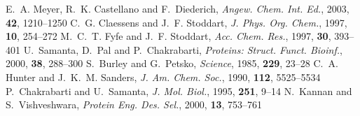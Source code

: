 \documentclass[twoside,twocolumn,9pt]{article}
\begin{document}
\begin{mcitethebibliography}{79}
E.~A. Meyer, R.~K. Castellano and F.~Diederich, \emph{Angew. Chem. Int. Ed.},
  2003, \textbf{42}, 1210--1250\relax
\mciteBstWouldAddEndPuncttrue
\mciteSetBstMidEndSepPunct{\mcitedefaultmidpunct}
{\mcitedefaultendpunct}{\mcitedefaultseppunct}\relax
\EndOfBibitem
{}
C.~G. Claessens and J.~F. Stoddart, \emph{J. Phys. Org. Chem.}, 1997,
  \textbf{10}, 254--272\relax
\mciteBstWouldAddEndPuncttrue
\mciteSetBstMidEndSepPunct{\mcitedefaultmidpunct}
{\mcitedefaultendpunct}{\mcitedefaultseppunct}\relax
\EndOfBibitem
{}
M.~C.~T. Fyfe and J.~F. Stoddart, \emph{Acc. Chem. Res.}, 1997, \textbf{30},
  393--401\relax
\mciteBstWouldAddEndPuncttrue
\mciteSetBstMidEndSepPunct{\mcitedefaultmidpunct}
{\mcitedefaultendpunct}{\mcitedefaultseppunct}\relax
\EndOfBibitem
{}
U.~Samanta, D.~Pal and P.~Chakrabarti, \emph{Proteins: Struct. Funct. Bioinf.},
  2000, \textbf{38}, 288--300\relax
\mciteBstWouldAddEndPuncttrue
\mciteSetBstMidEndSepPunct{\mcitedefaultmidpunct}
{\mcitedefaultendpunct}{\mcitedefaultseppunct}\relax
\EndOfBibitem
{}
S.~Burley and G.~Petsko, \emph{Science}, 1985, \textbf{229}, 23--28\relax
\mciteBstWouldAddEndPuncttrue
\mciteSetBstMidEndSepPunct{\mcitedefaultmidpunct}
{\mcitedefaultendpunct}{\mcitedefaultseppunct}\relax
\EndOfBibitem
{}
C.~A. Hunter and J.~K.~M. Sanders, \emph{J. Am. Chem. Soc.}, 1990,
  \textbf{112}, 5525--5534\relax
\mciteBstWouldAddEndPuncttrue
\mciteSetBstMidEndSepPunct{\mcitedefaultmidpunct}
{\mcitedefaultendpunct}{\mcitedefaultseppunct}\relax
\EndOfBibitem
{}
P.~Chakrabarti and U.~Samanta, \emph{J. Mol. Biol.}, 1995, \textbf{251},
  9--14\relax
\mciteBstWouldAddEndPuncttrue
\mciteSetBstMidEndSepPunct{\mcitedefaultmidpunct}
{\mcitedefaultendpunct}{\mcitedefaultseppunct}\relax
\EndOfBibitem
{}
N.~Kannan and S.~Vishveshwara, \emph{Protein Eng. Des. Sel.}, 2000,
  \textbf{13}, 753--761\relax
\mciteBstWouldAddEndPuncttrue
\mciteSetBstMidEndSepPunct{\mcitedefaultmidpunct}
{\mcitedefaultendpunct}{\mcitedefaultseppunct}\relax

\end{mcitethebibliography}
\end{document}
